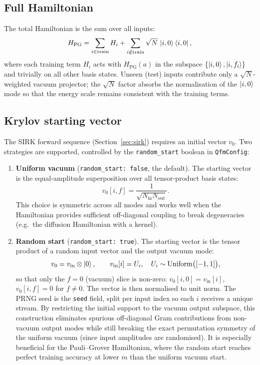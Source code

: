 \documentclass[11pt, a4paper]{article}
\begin{document}
\subsection{Full Hamiltonian}

The total Hamiltonian is the sum over all inputs:
\[
H_{\mathrm{PG}} = \sum_{i\in\mathrm{train}} H_i
               + \sum_{i\notin\mathrm{train}} \sqrt{N}\,\ket{i,0}\bra{i,0},
\]
where each training term $H_i$ acts with $H_{\mathrm{PG}}(a)$ in the
subspace $\{\ket{i,0},\ket{i,f_i}\}$ and trivially on all other basis
states. Unseen (test) inputs contribute only a $\sqrt{N}$-weighted vacuum
projector; the $\sqrt{N}$ factor absorbs the normalisation of the
$\ket{i,0}$ mode so that the energy scale remains consistent with the
training terms.

\subsection{Krylov starting vector}

The SIRK forward sequence (Section~\ref{sec:sirk}) requires an initial
vector $v_0$. Two strategies are supported, controlled by the
\texttt{random\_start} boolean in \texttt{QfmConfig}:

\begin{enumerate}
  \item \textbf{Uniform vacuum} (\texttt{random\_start: false}, the
    default). The starting vector is the equal-amplitude superposition over
    all tensor-product basis states:
    \[
    v_0[i,f] = \frac{1}{\sqrt{N_{\mathrm{in}}N_{\mathrm{out}}}}.
    \]
    This choice is symmetric across all modes and works well when the
    Hamiltonian provides sufficient off-diagonal coupling to break
    degeneracies (e.g.\ the diffusion Hamiltonian with a kernel).

  \item \textbf{Random start} (\texttt{random\_start: true}). The starting
    vector is the tensor product of a random input vector and the output
    vacuum mode:
    \[
    v_0 = v_{\mathrm{in}} \otimes \ket{0},\qquad
    v_{\mathrm{in}}[i] = U_i,\quad
    U_i\sim\mathrm{Uniform}\bigl([-1,1]\bigr),
    \]
    so that only the $f=0$ (vacuum) slice is non-zero:
    $v_0[i,0]=v_{\mathrm{in}}[i]$, $v_0[i,f]=0$ for $f\neq0$.
    The vector is then normalised to unit norm. The PRNG seed is the
    \texttt{seed} field, split per input index so each $i$ receives a
    unique stream. By restricting the initial support to the vacuum output
    subspace, this construction eliminates spurious off-diagonal Gram
    contributions from non-vacuum output modes while still breaking the
    exact permutation symmetry of the uniform vacuum (since input
    amplitudes are randomised). It is especially beneficial for the
    Pauli--Grover Hamiltonian, where the random start reaches perfect
    training accuracy at lower $m$ than the uniform vacuum start.
\end{enumerate}
\end{document}
